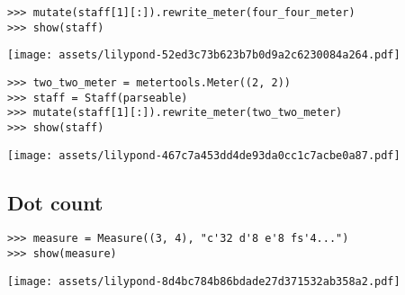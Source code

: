 \begin{comment}
<abjad>
mutate(staff[1][:]).rewrite_meter(four_four_meter)
show(staff)
</abjad>
\end{comment}

\begin{singlespacing}
\vspace{-0.5\baselineskip}
\begin{lstlisting}
>>> mutate(staff[1][:]).rewrite_meter(four_four_meter)
>>> show(staff)
\end{lstlisting}
\noindent\texttt{[image: assets/lilypond-52ed3c73b623b7b0d9a2c6230084a264.pdf]}
\end{singlespacing}

\begin{comment}
<abjad>
two_two_meter = metertools.Meter((2, 2))
staff = Staff(parseable)
mutate(staff[1][:]).rewrite_meter(two_two_meter)
show(staff)
</abjad>
\end{comment}

\begin{singlespacing}
\vspace{-0.5\baselineskip}
\begin{lstlisting}
>>> two_two_meter = metertools.Meter((2, 2))
>>> staff = Staff(parseable)
>>> mutate(staff[1][:]).rewrite_meter(two_two_meter)
>>> show(staff)
\end{lstlisting}
\noindent\texttt{[image: assets/lilypond-467c7a453dd4de93da0cc1c7acbe0a87.pdf]}
\end{singlespacing}

\subsection{Dot count} %

\begin{comment}
<abjad>
measure = Measure((3, 4), "c'32 d'8 e'8 fs'4...")
show(measure)
</abjad>
\end{comment}

\begin{singlespacing}
\vspace{-0.5\baselineskip}
\begin{lstlisting}
>>> measure = Measure((3, 4), "c'32 d'8 e'8 fs'4...")
>>> show(measure)
\end{lstlisting}
\noindent\texttt{[image: assets/lilypond-8d4bc784b86bdade27d371532ab358a2.pdf]}
\end{singlespacing}

